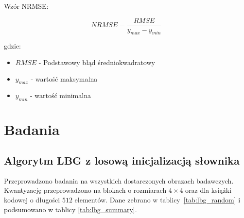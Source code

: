 \documentclass{article}
\begin{document}
Wzór NRMSE:

\begin{equation}
NRMSE = \frac{RMSE}{y_{max} - y_{min}}
\end{equation}

gdzie:
\begin{itemize}[label=]
    \item $RMSE$ - Podstawowy błąd średniokwadratowy
    \item $y_{max}$ - wartość maksymalna
    \item $y_{min}$ - wartość minimalna
\end{itemize}

\section{Badania}

\subsection{Algorytm LBG z losową inicjalizacją słownika}

Przeprowadzono badania na wszystkich dostarczonych obrazach badawczych. Kwantyzację przeprowadzono na blokach o rozmiarach $4 \times 4$ oraz dla książki
kodowej o długości $512$ elementów. Dane zebrano w \mbox{tablicy \ref{tab:lbg_random}} i podsumowano w tablicy \mbox{\ref{tab:lbg_summary}}.
\end{document}
